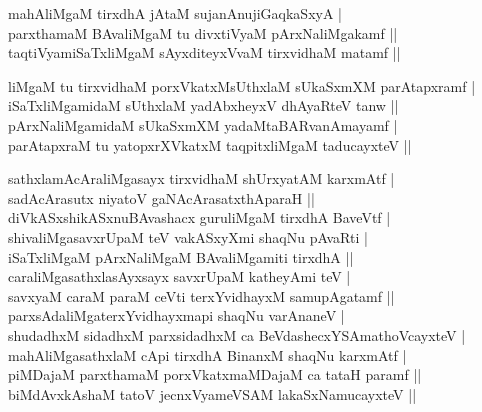\begin{entry}
\smallskip
\begin{shl}
mahAliMgaM tirxdhA jAtaM sujanAnujiGaqkaSxyA |\\
parxthamaM BAvaliMgaM tu divxtiVyaM pArxNaliMgakamf ||\\
taqtiVyamiSaTxliMgaM sAyxditeyxVvaM tirxvidhaM matamf ||
\end{shl}
\medskip
{}
\smallskip
\begin{shl}
liMgaM tu tirxvidhaM porxVkatxMsUthxlaM sUkaSxmXM parAtapxramf |\\
iSaTxliMgamidaM sUthxlaM yadAbxheyxV dhAyaRteV tanw ||\\
pArxNaliMgamidaM sUkaSxmXM yadaMtaBARvanAmayamf |\\
parAtapxraM tu yatopxrXVkatxM taqpitxliMgaM taducayxteV ||
\end{shl}
\medskip
{}
\smallskip
\begin{shl}
sathxlamAcAraliMgasayx tirxvidhaM shUrxyatAM karxmAtf |\\
sadAcArasutx niyatoV gaNAcArasatxthAparaH ||\\
diVkASxshikASxnuBAvashacx guruliMgaM tirxdhA BaveVtf |\\
shivaliMgasavxrUpaM teV vakASxyXmi shaqNu pAvaRti |\\
iSaTxliMgaM pArxNaliMgaM BAvaliMgamiti tirxdhA ||\\
caraliMgasathxlasAyxsayx savxrUpaM katheyAmi teV |\\
savxyaM caraM paraM ceVti terxYvidhayxM samupAgatamf ||\\
parxsAdaliMgaterxYvidhayxmapi shaqNu varAnaneV |\\
shudadhxM sidadhxM parxsidadhxM ca BeVdashecxYSAmathoVcayxteV |\\
mahAliMgasathxlaM cApi tirxdhA BinanxM shaqNu karxmAtf |\\
piMDajaM parxthamaM porxVkatxmaMDajaM ca tataH paramf ||\\
biMdAvxkAshaM tatoV jecnxVyameVSAM lakaSxNamucayxteV ||
\end{shl}
\medskip
{}
\end{entry}

